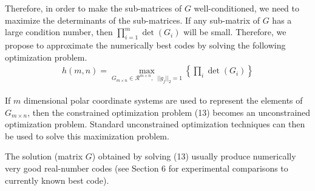\documentclass{sig-alternate}
\begin{document}
Therefore, in order to make the sub-matrices of $G$ well-conditioned,
we need to maximize the determinants of the sub-matrices. 
If any sub-matrix of $G$ has a large condition number,
then $\prod_{i=1}^m \det(G_i)$ will be small. Therefore,
we propose to approximate the numerically best codes
by solving the following optimization problem.
\begin{eqnarray}
h(m,n) = 
\displaystyle \max_{G_{m \times n} \in \mathcal{R}^{m \times n}, \;\; ||g_j||_2=1} \left\{ \prod_i \det (G_i) \right\}
\end{eqnarray}


If $m$ dimensional polar coordinate systems are used to represent the elements of $G_{m \times n}$, 
then the constrained optimization problem (13) becomes an unconstrained optimization problem. 
Standard unconstrained optimization techniques can then be used to solve this maximization problem.

The solution (matrix $G$) obtained by solving (13) usually produce numerically very good real-number
codes (see Section 6 for experimental comparisons to currently known best code).
 
\end{document}

